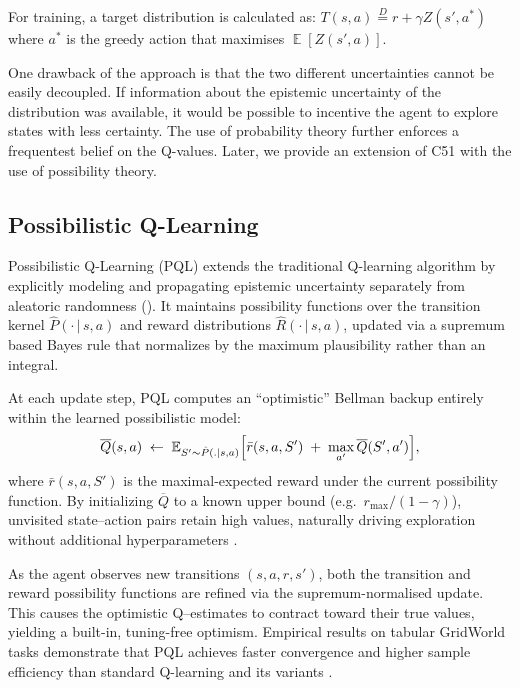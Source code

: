 \documentclass[11pt,a4paper]{report}
\DeclareMathOperator{\EX}{\mathbb{E}}
\begin{document}
\par
For training, a target distribution is calculated as: \(T(s,a) \overset{D}{=} r + \gamma Z(s', a^*)\) where $a^*$ is the greedy action that maximises $\EX[Z(s', a)]$. \par

One drawback of the approach is that the two different uncertainties cannot be easily decoupled. If information about the epistemic uncertainty of the distribution was available, it would be possible to incentive the agent to explore states with less certainty. The use of probability theory further enforces a frequentest belief on the Q-values. Later, we provide an extension of C51 with the use of possibility theory.  


\subsection{Possibilistic Q-Learning}

Possibilistic Q-Learning (PQL) extends the traditional Q-learning algorithm by explicitly modeling and propagating epistemic uncertainty separately from aleatoric randomness (\cite{thomas2025}). It maintains possibility functions over the transition kernel $\hat{P}(\cdot\,|\,s,a)$ and reward distributions $\hat{R}(\cdot\,|\,s,a)$, updated via a supremum based Bayes rule that normalizes by the maximum plausibility rather than an integral.

At each update step, PQL computes an “optimistic” Bellman backup entirely within the learned possibilistic model:
\[
  \overline{Q}(s,a)\;\leftarrow\;\mathbb{E}_{S'\sim \hat P(. \mid s,a)}\Bigl[\bar r(s,a,S') \;+\;\max_{a'}\overline{Q}(S',a')\Bigr],
\]
where $\bar r(s,a,S')$ is the maximal‐expected reward under the current possibility function. By initializing $\overline{Q}$ to a known upper bound (e.g.\ $r_{\max}/(1-\gamma)$), unvisited state–action pairs retain high values, naturally driving exploration without additional hyperparameters \cite{thomas2025}.

As the agent observes new transitions $(s,a,r,s')$, both the transition and reward possibility functions are refined via the supremum-normalised update. This causes the optimistic Q–estimates to contract toward their true values, yielding a built-in, tuning-free optimism. Empirical results on tabular GridWorld tasks demonstrate that PQL achieves faster convergence and higher sample efficiency than standard Q-learning and its variants \cite{thomas2025}.
\end{document}
